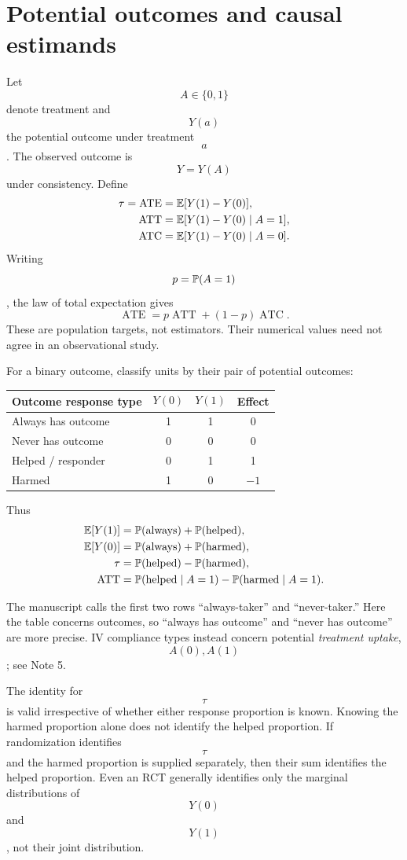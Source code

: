 \section{Potential outcomes and causal estimands}
Let $$A\in\{0,1\}$$ denote treatment and $$Y(a)$$ the potential outcome under treatment $$a$$. The observed outcome is $$Y=Y(A)$$ under consistency. Define
\begin{align}
\tau=\operatorname{ATE}&=\mathbb E[Y(1)-Y(0)],\\
\operatorname{ATT}&=\mathbb E[Y(1)-Y(0)\mid A=1],\\
\operatorname{ATC}&=\mathbb E[Y(1)-Y(0)\mid A=0].
\end{align}
Writing $$p=\mathbb P(A=1)$$, the law of total expectation gives
\begin{equation}
\operatorname{ATE}=p\operatorname{ATT}+(1-p)\operatorname{ATC}.
\end{equation}
These are population targets, not estimators. Their numerical values need not agree in an observational study.

For a binary outcome, classify units by their pair of potential outcomes:
\begin{center}
\begin{tabular}{lccc}\toprule
Outcome response type & $$Y(0)$$ & $$Y(1)$$ & Effect\\\midrule
Always has outcome & 1&1&0\\
Never has outcome & 0&0&0\\
Helped / responder & 0&1&1\\
Harmed & 1&0&$$-1$$\\\bottomrule
\end{tabular}
\end{center}
Thus
\begin{align}
\mathbb E[Y(1)]&=\mathbb P(\text{always})+\mathbb P(\text{helped}),\\
\mathbb E[Y(0)]&=\mathbb P(\text{always})+\mathbb P(\text{harmed}),\\
\tau&=\mathbb P(\text{helped})-\mathbb P(\text{harmed}),\\
\operatorname{ATT}&=\mathbb P(\text{helped}\mid A=1)-\mathbb P(\text{harmed}\mid A=1).
\end{align}
\begin{correction}
The manuscript calls the first two rows ``always-taker'' and ``never-taker.'' Here the table concerns outcomes, so ``always has outcome'' and ``never has outcome'' are more precise. IV compliance types instead concern potential \emph{treatment uptake}, $$A(0),A(1)$$; see Note 5.
\end{correction}
\begin{remarkbox}
The identity for $$\tau$$ is valid irrespective of whether either response proportion is known. Knowing the harmed proportion alone does not identify the helped proportion. If randomization identifies $$\tau$$ and the harmed proportion is supplied separately, then their sum identifies the helped proportion. Even an RCT generally identifies only the marginal distributions of $$Y(0)$$ and $$Y(1)$$, not their joint distribution.
\end{remarkbox}

